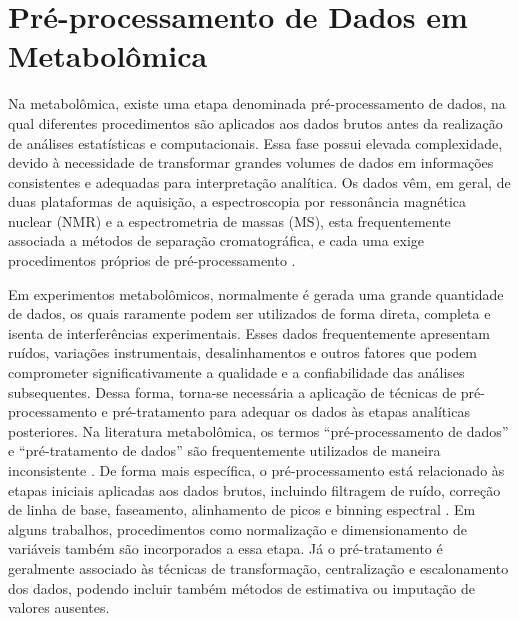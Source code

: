 \section{\textbf{Pré-processamento de Dados em Metabolômica}}

Na metabolômica, existe uma etapa denominada pré-processamento de dados, na qual diferentes procedimentos são aplicados aos dados brutos antes da realização de análises estatísticas e computacionais. Essa fase possui elevada complexidade, devido à necessidade de transformar grandes volumes de dados em informações consistentes e adequadas para interpretação analítica. Os dados vêm, em geral, de duas plataformas de aquisição, a espectroscopia por ressonância magnética nuclear (NMR) e a espectrometria de massas (MS), esta frequentemente associada a métodos de separação cromatográfica, e cada uma exige procedimentos próprios de pré-processamento \cite{LILAND2011827}. 

Em experimentos metabolômicos, normalmente é gerada uma grande quantidade de dados, os quais raramente podem ser utilizados de forma direta, completa e isenta de interferências experimentais. Esses dados frequentemente apresentam ruídos, variações instrumentais, desalinhamentos e outros fatores que podem comprometer significativamente a qualidade e a confiabilidade das análises subsequentes. Dessa forma, torna-se necessária a aplicação de técnicas de pré-processamento e pré-tratamento para adequar os dados às etapas analíticas posteriores. Na literatura metabolômica, os termos “pré-processamento de dados” e “pré-tratamento de dados” são frequentemente utilizados de maneira inconsistente \cite{sun2024pretreating}. De forma mais específica, o pré-processamento está relacionado às etapas iniciais aplicadas aos dados brutos, incluindo filtragem de ruído, correção de linha de base, faseamento, alinhamento de picos e binning espectral \cite{sun2024pretreating}. Em alguns trabalhos, procedimentos como normalização e dimensionamento de variáveis também são incorporados a essa etapa. Já o pré-tratamento é geralmente associado às técnicas de transformação, centralização e escalonamento dos dados, podendo incluir também métodos de estimativa ou imputação de valores ausentes.

